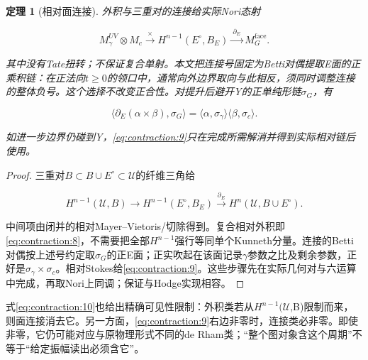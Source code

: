 \documentclass[11pt,a4paper,oneside]{ctexart}
\theoremstyle{cnplain}
\newtheorem{theorem}{定理}[section]
\theoremstyle{definition}
\theoremstyle{remark}
\numberwithin{equation}{section}
\begin{document}
\begin{theorem}[相对面连接]

\label{thm:contraction:3.1} 外积与三重对的连接给实际Nori态射

\begin{equation}
M_\gamma^{UV}\otimes M_c
 \xrightarrow{\ \times\ }H^{n-1}(E^\circ,B_E)
 \xrightarrow{\ \partial_E\ }M_G^{\mathrm{face}}.                \label{eq:contraction:8}
\end{equation}

其中没有Tate扭转；不保证复合单射。本文把连接号固定为Betti对偶提取E面的正乘积链：在正法向\(t\ge 0\)的领口中，通常向外边界取向与此相反，须同时调整连接的整体负号。这个选择不改变正合性。对提升后避开Y的正单纯形链\(\sigma _G\)，有

\begin{equation}
\langle\partial_E(\alpha\times\beta),\sigma_G\rangle
    =\langle\alpha,\sigma_\gamma\rangle
       \langle\beta,\sigma_c\rangle.                             \label{eq:contraction:9}
\end{equation}

如进一步边界仍碰到Y，\eqref{eq:contraction:9}只在完成所需解消并得到实际相对链后使用。

\end{theorem}

\begin{proof}

三重对\(B\subset B\cup E^\circ\subset \)\(\mathcal U\)的纤维三角给

\begin{equation}
H^{n-1}(\mathcal U,B)\longrightarrow H^{n-1}(E^\circ,B_E)
 \xrightarrow{\partial_E}H^n(\mathcal U,B\cup E^\circ).            \label{eq:contraction:10}
\end{equation}

中间项由闭并的相对Mayer--Vietoris/切除得到。复合相对外积即\eqref{eq:contraction:8}，不需要把全部\(H^{n- 1}\)强行等同单个Kunneth分量。连接的Betti对偶按上述号约定取\(\sigma _G\)的正E面；正实吹起在该面记录\(\gamma \)参数之比及剩余参数，正好是\(\sigma _\gamma \times \sigma _c\)。相对Stokes给\eqref{eq:contraction:9}。这些步骤先在实际几何对与六运算中完成，再取Nori上同调；\cite{tubach}保证与Hodge实现相容。

\end{proof}

式\eqref{eq:contraction:10}也给出精确可见性限制：外积类若从\(H^{n- 1}(\)\(\mathcal U\),B)限制而来，则面连接消去它。另一方面，\eqref{eq:contraction:9}右边非零时，连接类必非零。即使非零，它仍可能对应与原物理形式不同的de Rham类；``整个图对象含这个周期''不等于``给定振幅读出必须含它''。
\end{document}
